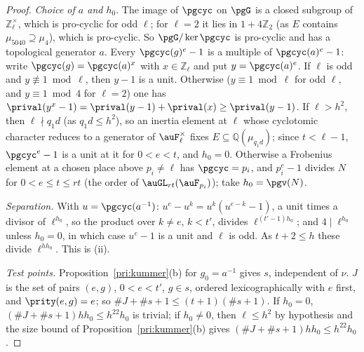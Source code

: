 \documentclass[10pt]{amsart}
\theoremstyle{definition}
\theoremstyle{remark}
\newcommand{\Z}{\mathbb Z}
\newcommand{\Q}{\mathbb Q}
\begin{document}
\begin{proof}
\emph{Choice of $a$ and $h_0$}. The image of $\pgcyc$ on $\pgG$ is a closed subgroup of
$\Z_\ell^\times$, which is pro-cyclic for odd $\ell$; for $\ell=2$ it lies in $1+4\Z_2$ (as $E$
contains $\mu_{5040}\supseteq\mu_4$), which is pro-cyclic. So $\pgG/\ker\pgcyc$ is pro-cyclic and has a
topological generator $a$. Every $\pgcyc(g)^e-1$ is a multiple of $\pgcyc(a)^e-1$: write
$\pgcyc(g)=\pgcyc(a)^x$ with $x\in\Z_\ell$ and put $y=\pgcyc(a)^e$. If $\ell$ is odd and
$y\not\equiv1\bmod\ell$, then $y-1$ is a unit. Otherwise ($y\equiv1\bmod\ell$ for odd $\ell$, and
$y\equiv1\bmod4$ for $\ell=2$) one has $\prival(y^x-1)=\prival(y-1)+\prival(x)\ge\prival(y-1)$. If $\ell>h^2$,
then $\ell\nmid q_1d$ (as $q_1d\le h^2$), so an inertia element at $\ell$ whose cyclotomic character
reduces to a generator of $\auF_\ell^\times$ fixes $E\subseteq\Q(\mu_{q_1d})$; since $t<\ell-1$,
$\pgcyc^e-1$ is a unit at it for $0<e<t$, and $h_0=0$. Otherwise a Frobenius element at a chosen place
above $p_i\ne\ell$ has $\pgcyc=p_i$, and $p_i^e-1$ divides $N$ for $0<e\le t\le rt$ (the order of
$\auGL_{rt}(\auF_{p_i})$); take $h_0=\pgv(N)$.

\emph{Separation.} With $u=\pgcyc(a^{-1})$: $u^e-u^k=u^k(u^{e-k}-1)$, a unit times a divisor of
$\ell^{h_0}$, so the product over $k\ne e$, $k<t'$, divides $\ell^{(t'-1)h_0}$; and $4\mid\ell^{h_0}$
unless $h_0=0$, in which case $u^e-1$ is a unit and $\ell$ is odd. As $t+2\le h$ these divide
$\ell^{hh_0}$. This is (ii).

\emph{Test points.} Proposition~\ref{pri:kummer}(b) for $g_0=a^{-1}$ gives $s$, independent of
$\nu$. $J$ is the set of pairs $(e,g)$, $0<e<t'$, $g\in s$, ordered lexicographically with $e$
first, and $\prity(e,g)=e$; so $\#J+\#s+1\le(t+1)(\#s+1)$. If $h_0=0$, $(\#J+\#s+1)hh_0\le h^{22}h_0$
is trivial; if $h_0\ne0$, then $\ell\le h^2$ by hypothesis and the size bound of
Proposition~\ref{pri:kummer}(b) gives $(\#J+\#s+1)hh_0\le h^{22}h_0$.


\end{proof}
\end{document}
